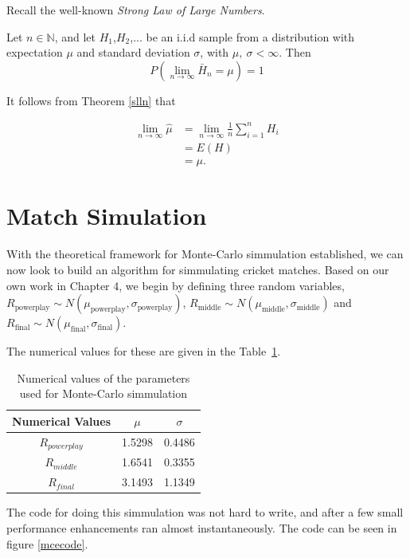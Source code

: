 Recall the well-known \textit{Strong Law of Large Numbers}.

\begin{theorem}
    \label{slln}
    Let $n \in \mathbb{N}$, and let $H_1$,$H_2$,... be an i.i.d sample from a distribution with expectation $\mu$ and standard deviation $\sigma$, with $\mu, \ \sigma < \infty$.
    Then 
    $$ 
        P\left( \lim_{n \to \infty} \bar{H}_n = \mu \right) = 1
    $$
\end{theorem}

It follows from Theorem \ref{slln} that

\begin{align}
\lim_{n \to \infty} \hat{\mu} &= \lim_{n \to \infty} \frac{1}{n}\sum_{i=1}^nH_i \\
                              &= E(H) \\
                              &= \mu.
\end{align}

\section{Match Simulation}
With the theoretical framework for Monte-Carlo simmulation established, we can now look to build an algorithm for simmulating cricket matches. Based on our own work in Chapter 4, 
we begin by defining three random variables, $R_{\text{powerplay}} \sim N(\mu_{\text{powerplay}},\sigma_\text{powerplay})$, $R_{\text{middle}} \sim N(\mu_{\text{middle}},\sigma_{\text{middle}})$
and $R_{\text{final}} \sim N(\mu_{\text{final}},\sigma_{\text{final}})$.

The numerical values for these are given in the Table~\ref{valTable}.

\begin{table}[h]
    \centering
    \begin{tabular}{c | c | c}
        Numerical Values & $\mu$ & $\sigma$ \\
        \hline
        $R_{powerplay}$ & 1.5298 & 0.4486 \\
        $R_{middle}$ & 1.6541 & 0.3355 \\
        $R_{final}$ & 3.1493 & 1.1349 
    \end{tabular}
    \caption{Numerical values of the parameters used for Monte-Carlo simmulation}
    \label{valTable}
\end{table}

The code for doing this simmulation was not hard to write, and after a few small performance enhancements ran almost instantaneously. The code can be seen in figure \ref{mcecode}.

